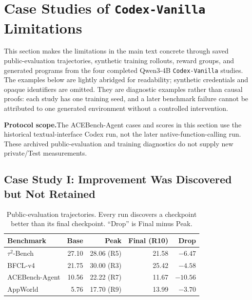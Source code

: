\begingroup
\color{blue}

\section{Case Studies of \texttt{Codex-Vanilla} Limitations}
\label{app:codexcases}

This section makes the limitations in the main text concrete through saved public-evaluation trajectories, synthetic training rollouts, reward groups, and generated programs from the four completed Qwen3-4B \texttt{Codex-Vanilla} studies. The examples below are lightly abridged for readability; synthetic credentials and opaque identifiers are omitted. They are diagnostic examples rather than causal proofs: each study has one training seed, and a later benchmark failure cannot be attributed to one generated environment without a controlled intervention.

\textbf{Protocol scope.}\quad The ACEBench-Agent cases and scores in this section use the historical textual-interface Codex run, not the later native-function-calling run. These archived public-evaluation and training diagnostics do not supply new private/Test measurements.

\subsection{Case Study I: Improvement Was Discovered but Not Retained}

\begin{table}[ht]
\color{blue}
\centering\small
\caption{Public-evaluation trajectories. Every run discovers a checkpoint better than its final checkpoint. ``Drop'' is Final minus Peak.}
\label{tab:codex_case_trajectory}
\begin{tabular}{@{}lrrrr@{}}
\toprule
Benchmark & Base & Peak & Final (R10) & Drop \\
\midrule
$\tau^2$-Bench & 27.10 & 28.06 (R5) & 21.58 & $-6.47$ \\
BFCL-v4 & 21.75 & 30.00 (R3) & 25.42 & $-4.58$ \\
ACEBench-Agent & 10.56 & 22.22 (R7) & 11.67 & $-10.56$ \\
AppWorld & 5.76 & 17.70 (R9) & 13.99 & $-3.70$ \\
\bottomrule
\end{tabular}
\end{table}


